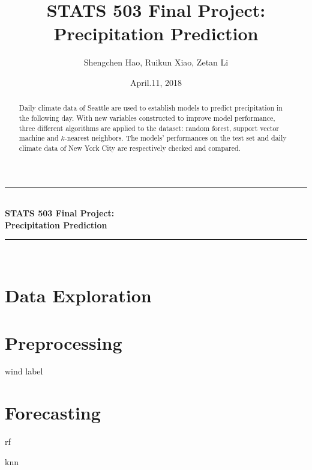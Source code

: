 \documentclass[letterpapaer]{article}
\title{STATS 503 Final Project:\\Precipitation Prediction}
\author{Shengchen Hao, Ruikun Xiao, Zetan Li}
\date{April.11, 2018}
\newcommand{\HRule}{\rule{\textwidth}{0.7mm}}
\begin{document}
\begin{titlepage}
\begin{center}
\HRule \\[0.4cm]
{ \huge \bfseries STATS 503 Final Project:\\ Precipitation Prediction}\\[0.2cm]
\HRule \\[0.6cm]
\end{center}

 \vspace{1cm}

\begin{abstract}
\large

Daily climate data of Seattle are used to establish models to predict precipitation in the following day. With new variables constructed to improve model performance, three different algorithms are applied to the dataset: random forest, support vector machine and $k$-nearest neighbors. The models' performances on the test set and daily climate data of New York City are respectively checked and compared.

\end{abstract}
\end{titlepage}
\tableofcontents

\section{Data Exploration}



\section{Preprocessing}


 {wind}
 {label}
\section{Forecasting}

 {rf}

 {knn}


 \vspace{3cm}

\end{document}
